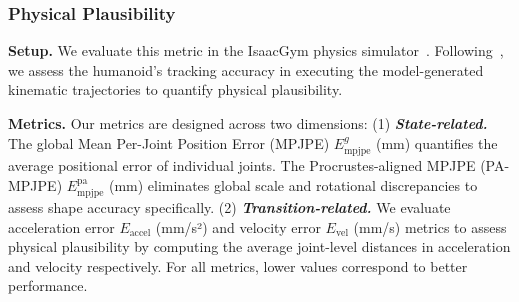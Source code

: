 \begin{table}
\centering
{}
\caption{\textbf{Ablation on data augmentation.} Here, low-quality data refers to motion data extracted through human motion recovery, which tends to lack precision. In contrast, high-quality data refers to motion data obtained directly from physical devices, ensuring greater accuracy.}
\label{tab:aug}
\vspace{-1.5em}
\end{table}



\subsubsection{Physical Plausibility }
\textbf{Setup.} 
We evaluate this metric in the IsaacGym physics simulator~\cite{makoviychuk2021isaac}.
Following~\cite{he2024omnih2o,ji2024exbody2}, we assess the humanoid's tracking accuracy in executing the model-generated kinematic trajectories to quantify physical plausibility.



\textbf{Metrics.}
Our metrics are designed across two dimensions: (1) \textit{\textbf{State-related.}} The global Mean Per-Joint Position Error (MPJPE) $E_{\text{mpjpe}}^{g}$ (mm) quantifies the average positional error of individual joints. The Procrustes-aligned MPJPE (PA-MPJPE) $E_{\text{mpjpe}}^\text{pa}$ (mm) eliminates global scale and rotational discrepancies to assess shape accuracy specifically. (2) \textit{\textbf{Transition-related.}} We evaluate acceleration error $E_{\text{accel}}$ (mm/s²) and velocity error $E_{\text{vel}}$ (mm/s) metrics to assess physical plausibility by computing the average joint-level distances in acceleration and velocity respectively.
For all metrics, lower values correspond to better performance.



